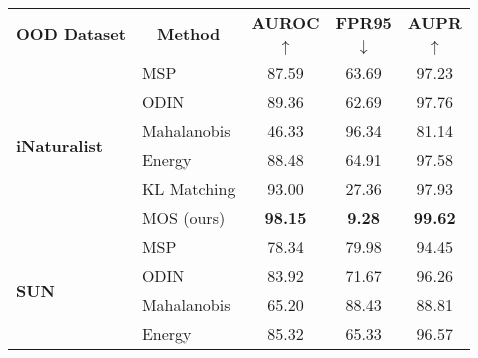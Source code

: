 \documentclass[final]{cvpr}
\begin{document}
\begin{table*}[h]
    \centering
    \footnotesize
\begin{tabular}{l|l|ccc}
\toprule
\multirow{2}{*}{\textbf{OOD Dataset}} & \multicolumn{1}{c|}{\multirow{2}{*}{\textbf{Method}}} & \textbf{AUROC}       & \textbf{FPR95}       & \textbf{AUPR}        \\
                                      & \multicolumn{1}{c|}{}                                 & \multicolumn{1}{c}{$\uparrow$} & \multicolumn{1}{c}{$\downarrow$} & \multicolumn{1}{c}{$\uparrow$} \\ \midrule
\multirow{6}{*}{\textbf{iNaturalist}} & MSP                                                   & 87.59                & 63.69                & 97.23                \\
                                      & ODIN                                                  & 89.36                & 62.69                & 97.76                \\
                                      & Mahalanobis                                           & 46.33                & 96.34                & 81.14                \\
                                      & Energy                                                & 88.48                & 64.91                & 97.58                \\
                                      & KL Matching                                           & 93.00                & 27.36                & 97.93                \\
                                      & MOS (ours)                                            & \textbf{98.15}       & \textbf{9.28}        & \textbf{99.62}       \\ \midrule
\multirow{6}{*}{\textbf{SUN}}         & MSP                                                   & 78.34                & 79.98                & 94.45                \\
                                      & ODIN                                                  & 83.92                & 71.67                & 96.26                \\
                                      & Mahalanobis                                           & 65.20                & 88.43                & 88.81                \\
                                      & Energy                                                & 85.32                & 65.33                & 96.57                \\

\end{tabular}
\end{table*}
\end{document}
